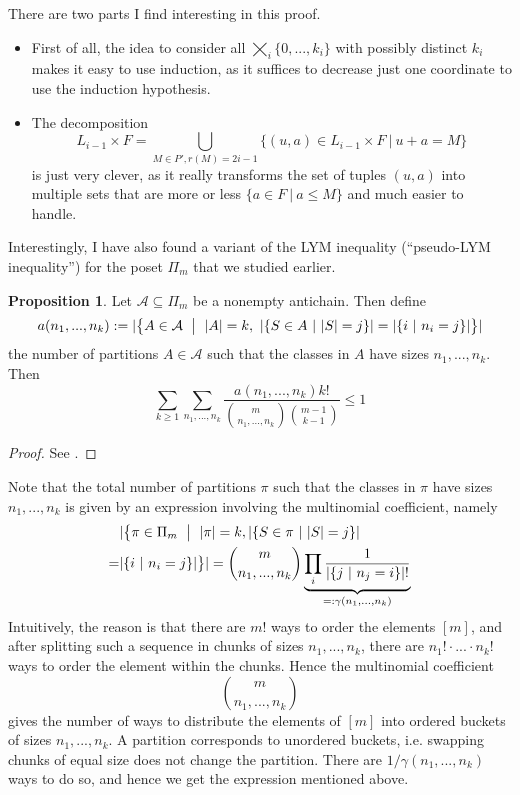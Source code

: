 \documentclass{scrartcl}
\theoremstyle{definition}
\newtheorem{proposition}[definition]{Proposition}
\begin{document}
There are two parts I find interesting in this proof.
\begin{itemize}
    \item First of all, the idea to consider all $\bigtimes_i \{ 0, ..., k_i \}$ with possibly distinct $k_i$ makes it easy to use induction, as it suffices to decrease just one coordinate to use the induction hypothesis.
    \item The decomposition
    \begin{equation*}
        L_{i - 1} \times F = \bigcup_{M \in P', r(M) = 2i - 1} \{ (u, a) \in L_{i - 1} \times F \ | \ u + a = M \}
    \end{equation*}
    is just very clever, as it really transforms the set of tuples $(u, a)$ into multiple sets that are more or less $\{ a \in F \ | \ a \leq M \}$ and much easier to handle.
\end{itemize}
Interestingly, I have also found a variant of the LYM inequality (``pseudo-LYM inequality'') for the poset $\Pi_m$ that we studied earlier.
\begin{proposition}
    \label{prop:lym_variant_partitions}
    Let $\mathcal{A} \subseteq \Pi_m$ be a nonempty antichain. Then define
    \begin{equation*}
        a(n_1, ..., n_k) := |\bigl\{ A \in \mathcal{A} \ \bigm| \ |A| = k, \ |\{ S \in A \ | \ |S| = j \}| = |\{ i \ | \ n_i = j \}| \bigr\}|
    \end{equation*}
    the number of partitions $A \in \mathcal{A}$ such that the classes in $A$ have sizes $n_1, ..., n_k$.
    Then
    \begin{equation*}
        \sum_{k \geq 1} \sum_{n_1, ..., n_k} \frac {a(n_1, ..., n_k) k!} {{m \choose n_1, ..., n_k} {m - 1 \choose k - 1}} \leq 1
    \end{equation*}
\end{proposition}
\begin{proof}
    See \cite{lym_partitions}.
\end{proof}
Note that the total number of partitions $\pi$ such that the classes in $\pi$ have sizes $n_1, ..., n_k$ is given by an expression involving the multinomial coefficient, namely
\begin{align*}
    &|\bigl\{ \pi \in \Pi_m \ \bigm| \ |\pi| = k, |\{ S \in \pi \ | \ |S| = j\}| \\
    = &|\{ i \ | \ n_i = j \}| \bigr\}| = {m \choose n_1, ..., n_k} \underbrace{ \prod_i \frac 1 {|\{ j \ | \ n_j = i\}|!} }_{=: \gamma(n_1, ..., n_k)}
\end{align*}
Intuitively, the reason is that there are $m!$ ways to order the elements $[m]$, and after splitting such a sequence in chunks of sizes $n_1, ..., n_k$, there are $n_1! \cdot ... \cdot n_k!$ ways to order the element within the chunks.
Hence the multinomial coefficient
\begin{equation*}
    {m \choose n_1, ..., n_k}
\end{equation*}
gives the number of ways to distribute the elements of $[m]$ into ordered buckets of sizes $n_1, ..., n_k$.
A partition corresponds to unordered buckets, i.e. swapping chunks of equal size does not change the partition.
There are $1/\gamma(n_1, ..., n_k)$ ways to do so, and hence we get the expression mentioned above.
\end{document}
